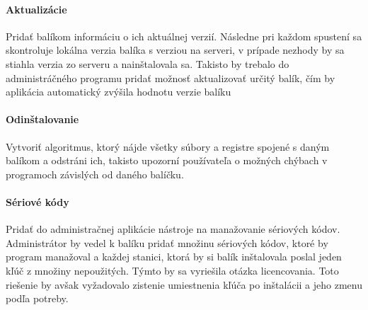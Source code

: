 \paragraph{Aktualizácie}
Pridať balíkom informáciu o ich aktuálnej verzií. Následne pri každom spustení sa skontroluje lokálna verzia balíka s verziou na serveri, v prípade nezhody by sa stiahla verzia zo serveru a nainštalovala sa. Takisto by trebalo do administráčného programu pridať možnosť aktualizovať určitý balík, čím by aplikácia automatický zvýšila hodnotu verzie balíku

\paragraph{Odinštalovanie}
Vytvoriť algoritmus, ktorý nájde všetky súbory a registre spojené s daným balíkom a odstráni ich, takisto upozorní používateľa o možných chýbach v programoch závislých od daného balíčku.

\paragraph{Sériové kódy}
Pridať do administračnej aplikácie nástroje na manažovanie sériových kódov. Administrátor by vedel k balíku pridať množinu sériových kódov, ktoré by program manažoval a každej stanici, ktorá by si balík inštalovala poslal jeden kľúč z množiny nepoužitých. Týmto by sa vyriešila otázka licencovania. Toto riešenie by avšak vyžadovalo zistenie umiestnenia kľúča po inštalácii a jeho zmenu podľa potreby.